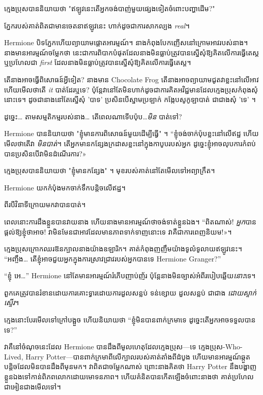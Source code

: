 ក្មេងប្រុសបាននិយាយថា "ឥឡូវនេះតើអ្នកចង់បាញ់មួយផ្សេងទៀតចំពោះបញ្ហាដើម?"

ភ្នែករបស់គាត់ពិតជាមានចេតនាឥឡូវនេះ ហាក់ដូចជាការសាកល្បង \emph{real}។

Hermione បិទភ្នែកហើយព្យាយាមផ្តោតអារម្មណ៍។ នាងកំពុងបែកញើសនៅក្រោមអាវរបស់នាង។ នាងមានអារម្មណ៍ចម្លែកថា នេះជាការពិបាកបំផុតដែលនាងមិនធ្លាប់ត្រូវបានស្នើសុំឱ្យគិតលើការធ្វើតេស្ត ឬប្រហែលជា \emph{first} ដែលនាងមិនធ្លាប់ត្រូវបានស្នើសុំឱ្យគិតលើការធ្វើតេស្ត។

តើនាងអាចធ្វើពិសោធន៍អ្វីទៀត? នាងមាន Chocolate Frog តើនាងអាចព្យាយាមជូតវាខ្លះនៅលើអាវ ហើយមើលថាតើ \emph{it} បាត់ដែរឬទេ? ប៉ុន្តែ​វា​នៅ​តែ​មិន​ហាក់​ដូច​ជា​ការ​គិត​អវិជ្ជមាន​ដែល​ក្មេង​ប្រុស​កំពុង​សុំ​នោះ​ទេ។ ដូចជានាងនៅតែស្នើសុំ 'បាទ' ប្រសិនបើស្នាមប្រឡាក់ កង្កែបសូកូឡាបាត់ ជាជាងសុំ 'ទេ' ។

ដូច្នេះ… តាមសម្មតិកម្មរបស់នាង… តើពេលណាទើបប៉ុប…\emph{មិន} បាត់ទៅ?

Hermione បាននិយាយថា "ខ្ញុំមានការពិសោធន៍មួយដើម្បីធ្វើ" ។ “ខ្ញុំចង់ចាក់ប៉ុបខ្លះនៅលើឥដ្ឋ ហើយមើលថាតើវា \emph{មិនបាត់}។ តើ​អ្នក​មាន​កន្សែង​ក្រដាស​ខ្លះ​នៅ​ក្នុង​កាបូប​របស់​អ្នក ដូច្នេះ​ខ្ញុំ​អាច​លុប​ការ​កំពប់​បាន​ប្រសិន​បើ​វា​មិន​ដំណើរការ?»

ក្មេងប្រុសបាននិយាយថា "ខ្ញុំមានកន្សែង" ។ មុខរបស់គាត់នៅតែមើលទៅអព្យាក្រឹត។

Hermione យក​កំប៉ុង​មក​ចាក់​ទឹក​បន្តិច​លើ​ឥដ្ឋ។

ពីរបីវិនាទីក្រោយមកវាបានបាត់។

ពេល​នោះ​ការ​ដឹង​ខ្លួន​បាន​វាយ​នាង ហើយ​នាង​មាន​អារម្មណ៍​ថា​ចង់​ទាត់​ខ្លួន​ឯង។ “ពិតណាស់! \emph{អ្នក}បានផ្តល់ឱ្យខ្ញុំថាអាច! វា​មិន​មែន​ជា​អាវ​ដែល​មាន​ភាព​ទាក់​ទាញ​នោះ​ទេ វា​គឺ​ជា​ការ​ពេញ​និយម​!»។

ក្មេង​ប្រុស​ក្រោក​ឈរ​ឱន​ក្បាល​នាង​យ៉ាង​ឧឡារិក។ គាត់កំពុងញញឹមយ៉ាងទូលំទូលាយឥឡូវនេះ។ “អញ្ចឹង… តើខ្ញុំអាចជួយអ្នកក្នុងការស្រាវជ្រាវរបស់អ្នកបានទេ Hermione Granger?”

“ខ្ញុំ អេ…” Hermione នៅតែមានអារម្មណ៍រំភើបញាប់ញ័រ ប៉ុន្តែនាងមិនច្បាស់អំពីរបៀបឆ្លើយ\emph{នោះ}ទេ។

ពួកគេ​ត្រូវ​បាន​រំខាន​ដោយ​ការ​គោះ​ទ្វារ​ដោយ​ការ​ដួល​សន្លប់ ទន់​ខ្សោយ ដួល​សន្លប់ ជា​ជាង \emph{ដោយ​ស្ទាក់​ស្ទើរ}។

ក្មេង​នោះ​បែរ​មើល​ទៅ​ក្រៅ​បង្អួច ហើយ​និយាយ​ថា “ខ្ញុំ​មិន​បាន​ពាក់​ក្រមា​ទេ ដូច្នេះ​តើ​អ្នក​អាច​ទទួល​បាន​ទេ?”

វាគឺនៅចំណុចនេះដែល Hermione បានដឹងពីមូលហេតុដែលក្មេងប្រុស—ទេ ក្មេងប្រុស-Who-Lived, Harry Potter—បានពាក់ក្រមាពីលើក្បាលរបស់គាត់តាំងពីដំបូង ហើយមានអារម្មណ៍ឆ្កួតបន្តិចដែលមិនបានដឹងពីមុនមក។ វាពិតជាចម្លែកណាស់ ព្រោះនាងគិតថា Harry Potter នឹងបង្ហាញខ្លួនឯងទៅកាន់ពិភពលោកដោយមោទនភាព។ ហើយគំនិតបានកើតឡើងចំពោះនាងថា គាត់ប្រហែលជាអៀនជាងមើលទៅ។

